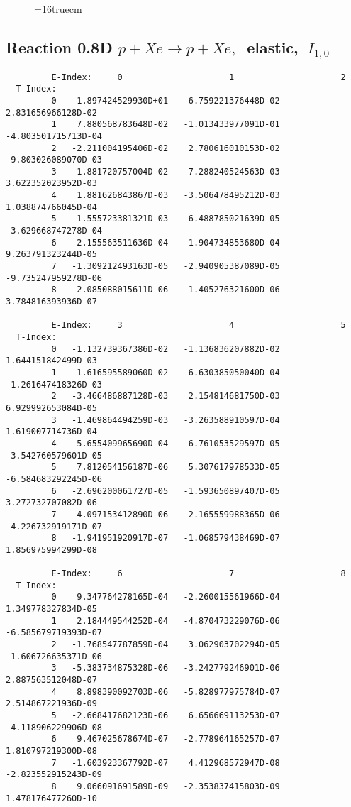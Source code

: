 \documentclass[12pt]{article}
\begin{document}
\begin{figure} \label{0.8T}
\epsfxsize=16truecm
\end{figure}

\newpage

\subsection{
Reaction 0.8D  $p + Xe \rightarrow p + Xe ,\ $
 elastic, $\  I_{1,0}$
}

\begin{small}\begin{verbatim}
         E-Index:     0                     1                     2
  T-Index:
         0   -1.897424529930D+01    6.759221376448D-02    2.831656966128D-02
         1    7.880568783648D-02   -1.013433977091D-01   -4.803501715713D-04
         2   -2.211004195406D-02    2.780616010153D-02   -9.803026089070D-03
         3   -1.881720757004D-02    7.288240524563D-03    3.622352023952D-03
         4    1.881626843867D-03   -3.506478495212D-03    1.038874766045D-04
         5    1.555723381321D-03   -6.488785021639D-05   -3.629668747278D-04
         6   -2.155563511636D-04    1.904734853680D-04    9.263791323244D-05
         7   -1.309212493163D-05   -2.940905387089D-05   -9.735247959278D-06
         8    2.085088015611D-06    1.405276321600D-06    3.784816393936D-07
 
         E-Index:     3                     4                     5
  T-Index:
         0   -1.132739367386D-02   -1.136836207882D-02    1.644151842499D-03
         1    1.616595589060D-02   -6.630385050040D-04   -1.261647418326D-03
         2   -3.466486887128D-03    2.154814681750D-03    6.929992653084D-05
         3   -1.469864494259D-03   -3.263588910597D-04    1.619007714736D-04
         4    5.655409965690D-04   -6.761053529597D-05   -3.542760579601D-05
         5    7.812054156187D-06    5.307617978533D-05   -6.584683292245D-06
         6   -2.696200061727D-05   -1.593650897407D-05    3.272732707082D-06
         7    4.097153412890D-06    2.165559988365D-06   -4.226732919171D-07
         8   -1.941951920917D-07   -1.068579438469D-07    1.856975994299D-08
 
         E-Index:     6                     7                     8
  T-Index:
         0    9.347764278165D-04   -2.260015561966D-04    1.349778327834D-05
         1    2.184449544252D-04   -4.870473229076D-06   -6.585679719393D-07
         2   -1.768547787859D-04    3.062903702294D-05   -1.606726635371D-06
         3   -5.383734875328D-06   -3.242779246901D-06    2.887563512048D-07
         4    8.898390092703D-06   -5.828977975784D-07    2.514867221936D-09
         5   -2.668417682123D-06    6.656669113253D-07   -4.118906229906D-08
         6    9.467025678674D-07   -2.778964165257D-07    1.810797219300D-08
         7   -1.603923367792D-07    4.412968572947D-08   -2.823552915243D-09
         8    9.066091691589D-09   -2.353837415803D-09    1.478176477260D-10
\end{verbatim}\end{small}
 
\end{document}
